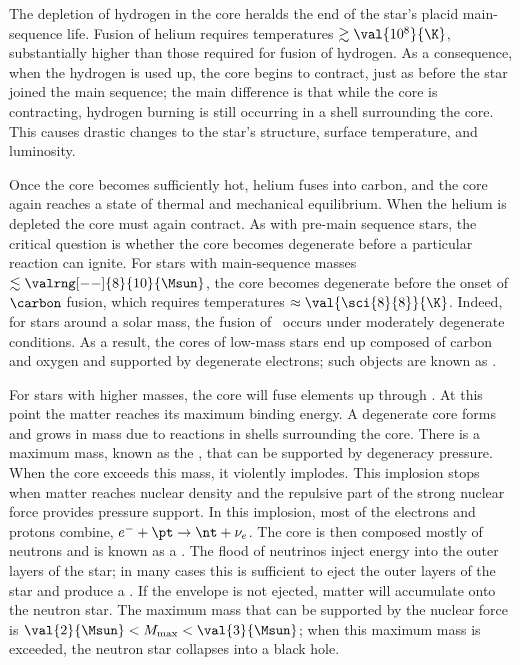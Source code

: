 
The depletion of hydrogen in the core heralds the end of the star's placid main-sequence life. Fusion of helium requires temperatures $\gtrsim\val{10^{8}}{\K}$, substantially higher than those required for fusion of hydrogen. As a consequence, when the hydrogen is used up, the core begins to contract, just as before the star joined the main sequence; the main difference is that while the core is contracting, hydrogen burning is still occurring in a shell surrounding the core. This causes drastic changes to the star's structure, surface temperature, and luminosity.

Once the core becomes sufficiently hot, helium fuses into carbon, and the core again reaches a state of thermal and mechanical equilibrium. When the helium is depleted the core must again contract. As with pre-main sequence stars, the critical question is whether the core becomes degenerate before a particular reaction can ignite. For stars with main-sequence masses $\lesssim \valrng[--]{8}{10}{\Msun}$, the core becomes degenerate before the onset of $\carbon$ fusion, which requires temperatures $\approx\val{\sci{8}{8}}{\K}$.  Indeed, for stars around a solar mass, the fusion of \helium\ occurs under moderately degenerate conditions.
As a result, the cores of low-mass stars end up composed of carbon and oxygen and supported by degenerate electrons; such objects are known as .

For stars with higher masses, the core will fuse elements up through \iron. At this point the matter reaches its maximum binding energy. A degenerate core forms and grows in mass due to reactions in shells surrounding the core. There is a maximum mass, known as the , that can be supported by degeneracy pressure. When the core exceeds this mass, it violently implodes. This implosion stops when matter reaches nuclear density and the repulsive part of the strong nuclear force provides pressure support. In this implosion, most of the electrons and protons combine, $e^{-} + \pt \to \nt+\nu_{e}$. The core is then composed mostly of neutrons and is known as a .
The flood of neutrinos inject energy into the outer layers of the star; in many cases this is sufficient to eject the outer layers of the star and produce a . If the envelope is not ejected, matter will accumulate onto the neutron star. The maximum mass that can be supported by the nuclear force is $\val{2}{\Msun}<M_{\max}<\val{3}{\Msun}$; when this maximum mass is exceeded, the neutron star collapses into a black hole.

